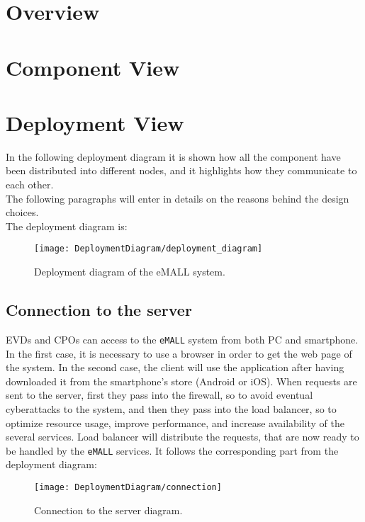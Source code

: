 \section{Overview}
\label{sec: overview}%


\section{Component View}
\label{sec: component_view}%


\section{Deployment View}
\label{sec: deployment_view}%
In the following deployment diagram it is shown how all the component have been distributed into different nodes, and it
highlights how they communicate to each other. \\
The following paragraphs will enter in details on the reasons behind the design choices. \\
The deployment diagram is:
\begin{figure} [H]
    \begin{center}
        \texttt{[image: DeploymentDiagram/deployment\_diagram]}
        \caption{Deployment diagram of the eMALL system.}
        \label{fig: depl_diagram}
    \end{center}
\end{figure}

\subsection{Connection to the server}
\label{subsec:connection_to_the_server}%
EVDs and CPOs can access to the \verb|eMALL| system from both PC and smartphone.
In the first case, it is necessary to use a browser in order to get the web page of the system.
In the second case, the client will use the application after having downloaded it from the smartphone's store (Android or iOS).
When requests are sent to the server, first they pass into the firewall, so to avoid eventual cyberattacks to the system,
and then they pass into the load balancer, so to optimize resource usage, improve performance, and increase availability of the several services.
Load balancer will distribute the requests, that are now ready to be handled by the \verb|eMALL| services.
It follows the corresponding part from the deployment diagram:
\begin{figure} [H]
    \begin{center}
        \texttt{[image: DeploymentDiagram/connection]}
        \caption{Connection to the server diagram.}
        \label{fig: connection}
    \end{center}
\end{figure}

